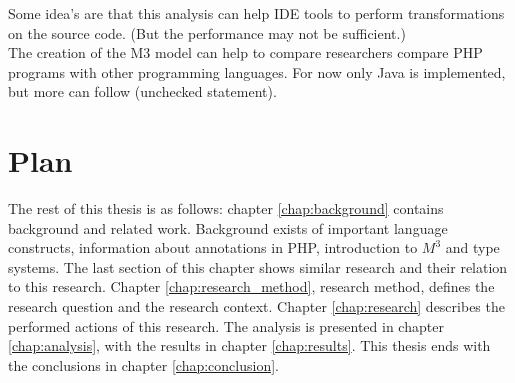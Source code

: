 \documentclass[../main.tex]{subfiles}
\begin{document}
        Some idea's are that this analysis can help IDE tools to perform transformations on the source code.
        (But the performance may not be sufficient.)
        \\
        The creation of the M3 model can help to compare researchers compare PHP programs with other programming languages. For now only Java is implemented, but more can follow (unchecked statement).
    
    \section{Plan} %
        The rest of this thesis is as follows:
        chapter \ref{chap:background} contains background and related work.
        Background exists of important language constructs, information about annotations in PHP, introduction to $M^3$ and type systems. 
        The last section of this chapter shows similar research and their relation to this research.
        Chapter \ref{chap:research_method}, research method, defines the research question and the research context.
        Chapter \ref{chap:research} describes the performed actions of this research. 
        The analysis is presented in chapter \ref{chap:analysis}, with the results in chapter \ref{chap:results}.
        This thesis ends with the conclusions in chapter \ref{chap:conclusion}.
        
        
\end{document}
